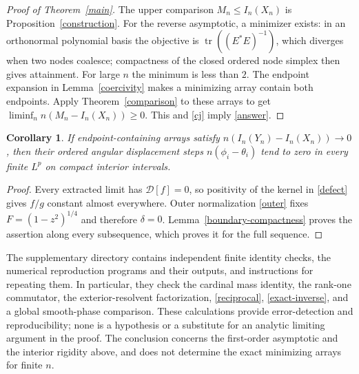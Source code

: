 \documentclass[a4paper,11pt]{amsart}
\newtheorem{corollary}[theorem]{Corollary}
\theoremstyle{remark}\newtheorem{remark}[theorem]{Remark}
\newcommand{\tr}{\operatorname{tr}}
\begin{document}
\begin{proof}[Proof of Theorem~\ref{main}]
The upper comparison $M_n\le I_n(X_n)$ is
Proposition~\ref{construction}. For the reverse asymptotic, a
minimizer exists: in an orthonormal polynomial basis the objective
is $\tr((E^*E)^{-1})$, which diverges when two nodes coalesce;
compactness of the closed ordered node simplex then gives attainment.
For large $n$ the minimum is less than $2$. The endpoint expansion
in Lemma~\ref{coercivity} makes a minimizing array contain both
endpoints. Apply Theorem~\ref{comparison} to these arrays to get
$\liminf_n n(M_n-I_n(X_n))\ge0$. This and \eqref{cj} imply
\eqref{answer}.
\end{proof}

\begin{corollary}\label{rigidity}
If endpoint-containing arrays satisfy
$n(I_n(Y_n)-I_n(X_n))\to0$, then their ordered angular displacement
steps $n(\phi_i-\theta_i)$ tend to zero in every finite $L^p$ on
compact interior intervals.
\end{corollary}

\begin{proof}
Every extracted limit has $\mathcal D[f]=0$, so positivity of the
kernel in \eqref{defect} gives $f/g$ constant almost everywhere.
Outer normalization \eqref{outer} fixes
$F=(1-z^2)^{1/4}$ and therefore $\delta=0$.
Lemma~\ref{boundary-compactness} proves the assertion along every
subsequence, which proves it for the full sequence.
\end{proof}

The supplementary directory  contains independent
finite identity checks, the numerical reproduction programs and their
outputs, and instructions for repeating them. In particular, they
check the cardinal mass identity, the rank-one commutator, the
exterior-resolvent factorization, \eqref{reciprocal},
\eqref{exact-inverse}, and a global smooth-phase comparison.
These calculations provide error-detection and reproducibility;
none is a hypothesis or a substitute for an analytic limiting
argument in the proof. The conclusion concerns the first-order
asymptotic and the interior rigidity above, and does not determine
the exact minimizing arrays for finite $n$.
\end{document}
